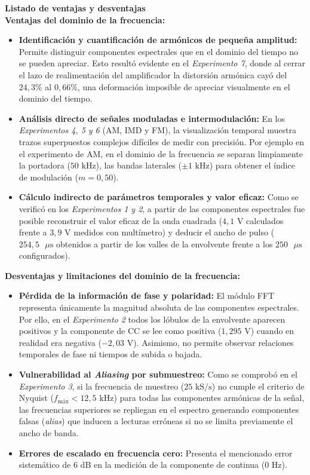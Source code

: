 \begin{centering}
\textbf{Listado de ventajas y desventajas}\\
\textbf{Ventajas del dominio de la frecuencia:}

\begin{itemize}
    \item \textbf{Identificación y cuantificación de armónicos de pequeña amplitud:} Permite distinguir componentes espectrales que en el dominio del tiempo no se pueden apreciar. Esto resultó evidente en el \textit{Experimento 7}, donde al cerrar el lazo de realimentación del amplificador la distorsión armónica cayó del $24,3\%$ al $0,66\%$, una deformación imposible de apreciar visualmente en el dominio del tiempo.
    \item \textbf{Análisis directo de señales moduladas e intermodulación:} En los \textit{Experimentos 4, 5 y 6} (AM, IMD y FM), la visualización temporal muestra trazos superpuestos complejos difíciles de medir con precisión. Por ejemplo en el experimento de AM, en el dominio de la frecuencia se separan limpiamente la portadora ($50\text{ kHz}$), las bandas laterales ($\pm 1\text{ kHz}$) para obtener el índice de modulación ($m = 0,50$).
    \item \textbf{Cálculo indirecto de parámetros temporales y valor eficaz:} Como se verificó en los \textit{Experimentos 1 y 2}, a partir de las componentes espectrales fue posible reconstruir el valor eficaz de la onda cuadrada ($4,1\text{ V}$ calculados frente a $3,9\text{ V}$ medidos con multímetro) y deducir el ancho de pulso ($254,5\text{ }\mu\text{s}$ obtenidos a partir de los valles de la envolvente frente a los $250\text{ }\mu\text{s}$ configurados).
\end{itemize}

\textbf{Desventajas y limitaciones del dominio de la frecuencia:}
\begin{itemize}
    \item \textbf{Pérdida de la información de fase y polaridad:} El módulo FFT representa únicamente la magnitud absoluta de las componentes espectrales. Por ello, en el \textit{Experimento 2} todos los lóbulos de la envolvente aparecen positivos y la componente de CC se lee como positiva ($1,295\text{ V}$) cuando en realidad era negativa ($-2,03\text{ V}$). Asimismo, no permite observar relaciones temporales de fase ni tiempos de subida o bajada.
    \item \textbf{Vulnerabilidad al \textit{Aliasing} por submuestreo:} Como se comprobó en el \textit{Experimento 3}, si la frecuencia de muestreo ($25\text{ kS/s}$) no cumple el criterio de Nyquist ($f_{\text{máx}} < 12,5\text{ kHz}$) para todas las componentes armónicas de la señal, las frecuencias superiores se repliegan en el espectro generando componentes falsas (\textit{alias}) que inducen a lecturas erróneas si no se limita previamente el ancho de banda.
    \item \textbf{Errores de escalado en frecuencia cero:} Presenta el mencionado error sistemático de $6\text{ dB}$ en la medición de la componente de continua ($0\text{ Hz}$).
\end{itemize}
\end{centering}

